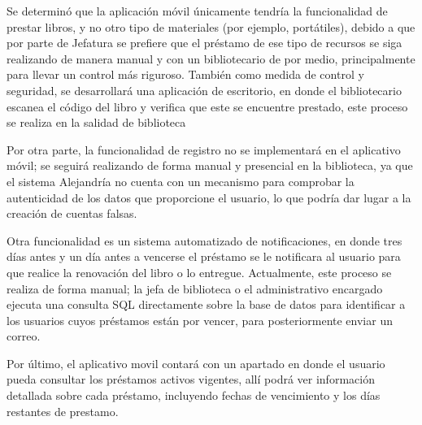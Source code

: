 \documentclass[spanish]{ieee_upb}
\begin{document}
Se determinó que la aplicación móvil únicamente tendría la funcionalidad de prestar libros, y no otro tipo de materiales (por ejemplo, portátiles), debido a que por parte de Jefatura se prefiere que el préstamo de ese tipo de recursos se siga realizando de manera manual y con un bibliotecario de por medio, principalmente para llevar un control más riguroso. También como medida de control y seguridad, se desarrollará una aplicación de escritorio, en donde el bibliotecario escanea el código del libro y verifica que este se encuentre prestado, este proceso se realiza en la salidad de biblioteca
\vspace{0.3 cm}

Por otra parte, la funcionalidad de registro no se implementará en el aplicativo móvil; se seguirá realizando de forma manual y presencial en la biblioteca, ya que el sistema Alejandría no cuenta con un mecanismo para comprobar la autenticidad de los datos que proporcione el usuario, lo que podría dar lugar a la creación de cuentas falsas.
\vspace{0.3 cm}

 Otra funcionalidad es un sistema automatizado de notificaciones, en donde tres días antes y un día antes a vencerse el préstamo se le notificara al usuario para que realice la renovación del libro o lo entregue. Actualmente, este proceso se realiza de forma manual; la jefa de biblioteca o el administrativo encargado ejecuta una consulta SQL directamente sobre la base de datos para identificar a los usuarios cuyos préstamos están por vencer, para posteriormente enviar un correo. 
\vspace{0.3 cm}

 Por último, el aplicativo movil contará con un apartado en donde el usuario pueda consultar los préstamos activos vigentes, allí podrá ver información detallada sobre cada préstamo, incluyendo fechas de vencimiento y los días restantes de prestamo.
 \vspace{0.3 cm}
\end{document}
